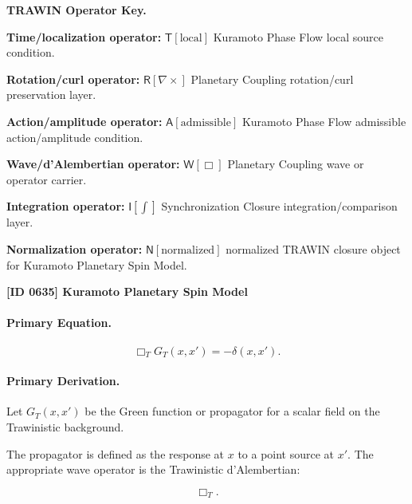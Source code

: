 \par\vspace{0.45\baselineskip}
\noindent\begin{minipage}[t]{\linewidth}
\begingroup
\small
\raggedright
\textbf{TRAWIN Operator Key.}\par
\noindent\textbf{Time/localization operator:} $\mathsf{T}\!\left[\mathrm{local}\right]$ Kuramoto Phase Flow local source condition.\par
\noindent\textbf{Rotation/curl operator:} $\mathsf{R}\!\left[\nabla\times\right]$ Planetary Coupling rotation/curl preservation layer.\par
\noindent\textbf{Action/amplitude operator:} $\mathsf{A}\!\left[\mathrm{admissible}\right]$ Kuramoto Phase Flow admissible action/amplitude condition.\par
\noindent\textbf{Wave/d'Alembertian operator:} $\mathsf{W}\!\left[\Box\right]$ Planetary Coupling wave or operator carrier.\par
\noindent\textbf{Integration operator:} $\mathsf{I}\!\left[\int\right]$ Synchronization Closure integration/comparison layer.\par
\noindent\textbf{Normalization operator:} $\mathsf{N}\!\left[\mathrm{normalized}\right]$ normalized TRAWIN closure object for Kuramoto Planetary Spin Model.\par
\endgroup
\end{minipage}

\clearpage
\noindent\textbf{[ID 0635] Kuramoto Planetary Spin Model}\par
\vspace{0.35em}
\paragraph{Primary Equation.}
\begin{equation}
\Box_T G_T(x,x')
=
-\delta(x,x') .
\end{equation}

\paragraph{Primary Derivation.}
Let $G_T(x,x')$ be the Green function or propagator for a scalar field on the Trawinistic background.

The propagator is defined as the response at $x$ to a point source at $x'$.  
The appropriate wave operator is the Trawinistic d'Alembertian:

\begin{equation}
\Box_T .
\end{equation}

